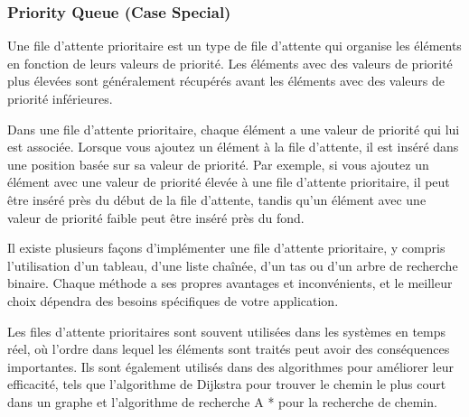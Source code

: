 \documentclass{article}
\begin{document}
            \subsubsection*{Priority Queue (Case Special)}
                Une file d'attente prioritaire est un type de file d'attente qui organise les éléments en fonction de leurs valeurs de priorité. Les éléments avec des valeurs de priorité plus élevées sont généralement récupérés avant les éléments avec des valeurs de priorité inférieures.

                Dans une file d'attente prioritaire, chaque élément a une valeur de priorité qui lui est associée. Lorsque vous ajoutez un élément à la file d'attente, il est inséré dans une position basée sur sa valeur de priorité. Par exemple, si vous ajoutez un élément avec une valeur de priorité élevée à une file d'attente prioritaire, il peut être inséré près du début de la file d'attente, tandis qu'un élément avec une valeur de priorité faible peut être inséré près du fond.

                Il existe plusieurs façons d'implémenter une file d'attente prioritaire, y compris l'utilisation d'un tableau, d'une liste chaînée, d'un tas ou d'un arbre de recherche binaire. Chaque méthode a ses propres avantages et inconvénients, et le meilleur choix dépendra des besoins spécifiques de votre application.

                Les files d'attente prioritaires sont souvent utilisées dans les systèmes en temps réel, où l'ordre dans lequel les éléments sont traités peut avoir des conséquences importantes. Ils sont également utilisés dans des algorithmes pour améliorer leur efficacité, tels que l'algorithme de Dijkstra pour trouver le chemin le plus court dans un graphe et l'algorithme de recherche A * pour la recherche de chemin.

                \newpage
                
\end{document}
